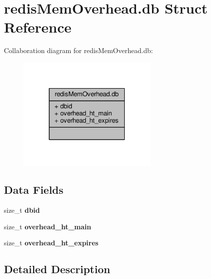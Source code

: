 \hypertarget{structredisMemOverhead_8db}{}\section{redis\+Mem\+Overhead.\+db Struct Reference}
\label{structredisMemOverhead_8db}


Collaboration diagram for redis\+Mem\+Overhead.\+db\+:\nopagebreak
\begin{figure}[H]
\begin{center}
\leavevmode
\includegraphics[width=196pt]{structredisMemOverhead_8db__coll__graph}
\end{center}
\end{figure}
\subsection*{Data Fields}
\begin{DoxyCompactItemize}
\item 
\mbox{\label{structredisMemOverhead_8db_ad72426bef53f59fc97b1772c0f3bf34a}} 
size\+\_\+t {\bfseries dbid}
\item 
\mbox{\label{structredisMemOverhead_8db_a80c839f0dccd678af426533abfd1e7f1}} 
size\+\_\+t {\bfseries overhead\+\_\+ht\+\_\+main}
\item 
\mbox{\label{structredisMemOverhead_8db_aa132c77982023179a57784cfc8adfb1f}} 
size\+\_\+t {\bfseries overhead\+\_\+ht\+\_\+expires}
\end{DoxyCompactItemize}


\subsection{Detailed Description}


